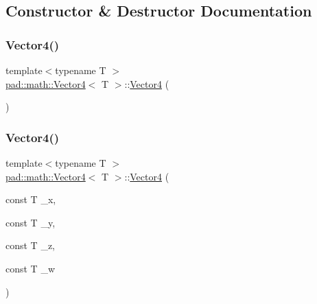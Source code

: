 \subsection{Constructor \& Destructor Documentation}
\mbox{\label{structpad_1_1math_1_1_vector4_a685f645bb73f9e7e2f0cfad10f8c9b3b}} 
\subsubsection{\texorpdfstring{Vector4()}{Vector4()}\hspace{0.1cm}{\footnotesize\ttfamily [1/5]}}
{\footnotesize\ttfamily template$<$typename T $>$ \\
\mbox{\hyperlink{structpad_1_1math_1_1_vector4}{pad\+::math\+::\+Vector4}}$<$ T $>$\+::\mbox{\hyperlink{structpad_1_1math_1_1_vector4}{Vector4}} (\begin{DoxyParamCaption}{ }\end{DoxyParamCaption})}

\mbox{\label{structpad_1_1math_1_1_vector4_a9ba6589a62f7635c2255c52c7b818aec}} 
\subsubsection{\texorpdfstring{Vector4()}{Vector4()}\hspace{0.1cm}{\footnotesize\ttfamily [2/5]}}
{\footnotesize\ttfamily template$<$typename T $>$ \\
\mbox{\hyperlink{structpad_1_1math_1_1_vector4}{pad\+::math\+::\+Vector4}}$<$ T $>$\+::\mbox{\hyperlink{structpad_1_1math_1_1_vector4}{Vector4}} (\begin{DoxyParamCaption}\item[{const T}]{\+\_\+x,  }\item[{const T}]{\+\_\+y,  }\item[{const T}]{\+\_\+z,  }\item[{const T}]{\+\_\+w }\end{DoxyParamCaption})}

\mbox{\label{structpad_1_1math_1_1_vector4_a44585061b6980544187b6309a3371061}} 

